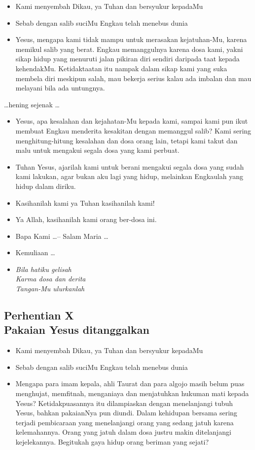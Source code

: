 \documentclass[a5paper,headsepline,titlepage,10pt,nnormalheadings,DIVcalc]{scrbook}
\newcommand{\BU}[1]{\begin{itemize} \item[U:] #1 \end{itemize}}
\newcommand{\BP}[1]{\begin{itemize} \item[P:] #1 \end{itemize}}
\newcommand{\BL}[1]{\begin{itemize} \item[L:] #1 \end{itemize}}
\begin{document}
\BP{Kami menyembah Dikau, ya Tuhan dan bersyukur kepadaMu}
\BU{Sebab dengan salib suciMu Engkau telah menebus dunia}
\BL{Yesus, mengapa kami tidak mampu untuk merasakan kejatuhan-Mu, karena memikul salib yang berat. Engkau memanggulnya karena dosa kami, yakni sikap hidup yang menuruti jalan pikiran diri sendiri daripada taat kepada kehendakMu. Ketidaktaatan itu nampak dalam sikap kami yang suka membela diri meskipun salah, mau bekerja serius kalau ada imbalan dan mau melayani bila ada untungnya.}

\begin{center}\dots hening sejenak \dots\end{center}

\BP{Yesus, apa kesalahan dan kejahatan-Mu kepada kami, sampai kami pun ikut membuat Engkau menderita kesakitan dengan memanggul salib? Kami sering menghitung-hitung kesalahan dan dosa orang lain, tetapi kami takut dan malu untuk mengakui segala dosa yang kami perbuat.}
\BU{Tuhan Yesus, ajarilah kami untuk berani mengakui segala dosa yang sudah kami lakukan, agar bukan aku lagi yang hidup, melainkan Engkaulah yang hidup dalam diriku.}
\BP{Kasihanilah kami ya Tuhan kasihanilah kami!}
\BU{Ya Allah, kasihanilah kami orang ber-dosa ini.}
\BP{Bapa Kami \dots -- Salam Maria \dots}
\BP{Kemuliaan \dots}

\begin{itemize}
\item[10.] \it{Bila hatiku gelisah\\
Karma dosa dan derita\\
Tangan-Mu ulurkanlah}
\end{itemize}



\subsection*{Perhentian X
\\Pakaian Yesus ditanggalkan}

\BP{Kami menyembah Dikau, ya Tuhan dan bersyukur kepadaMu}
\BU{Sebab dengan salib suciMu Engkau telah menebus dunia}
\BL{Mengapa para imam kepala, ahli Taurat dan para algojo masih belum puas menghujat, memfitnah, menganiaya dan menjatuhkan hukuman mati kepada Yesus? Ketidakpuasannya itu dilampiaskan dengan menelanjangi tubuh Yesus, bahkan pakaianNya pun diundi. Dalam kehidupan bersama sering terjadi pembicaraan yang menelanjangi orang yang sedang jatuh karena kelemahannya. Orang yang jatuh dalam dosa justru makin ditelanjangi kejelekannya. Begitukah gaya hidup orang beriman yang sejati?}
\end{document}

